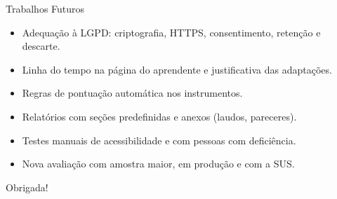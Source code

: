 \documentclass[compress]{beamer}
\begin{document}
\begin{frame}{Trabalhos Futuros}
\begin{itemize}
    \small
    \item Adequação à LGPD: criptografia, HTTPS, consentimento, retenção e descarte.
    \item Linha do tempo na página do aprendente e justificativa das adaptações.
    \item Regras de pontuação automática nos instrumentos.
    \item Relatórios com seções predefinidas e anexos (laudos, pareceres).
    \item Testes manuais de acessibilidade e com pessoas com deficiência.
    \item Nova avaliação com amostra maior, em produção e com a SUS.
\end{itemize}
\end{frame}

\begin{frame}[standout]
  Obrigada!
\end{frame}
\end{document}
